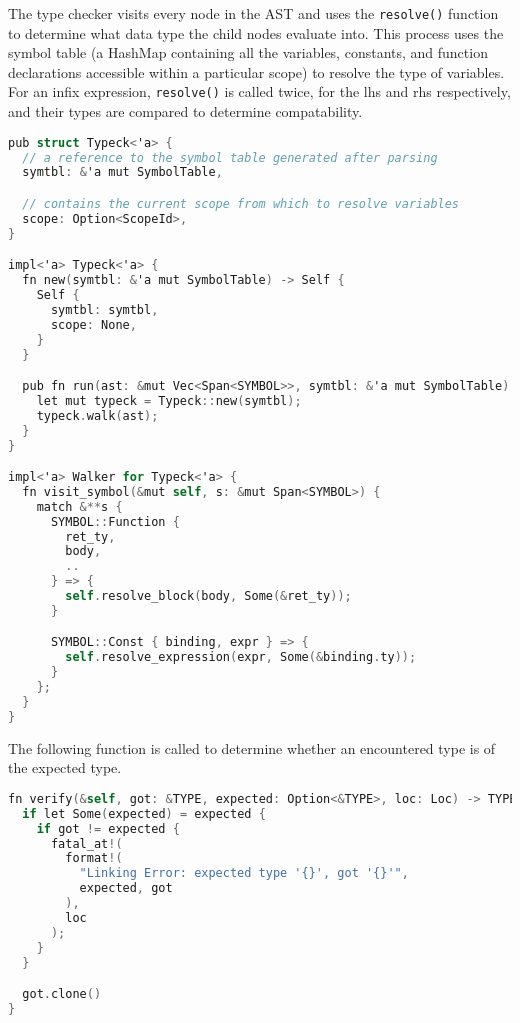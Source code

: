 The type checker visits every node in the AST and uses the \texttt{resolve()} function to determine what data type the child nodes evaluate into. This process uses the symbol table (a HashMap containing all the variables, constants, and function declarations accessible within a particular scope) to resolve the type of variables. For an infix expression, \texttt{resolve()} is called twice, for the lhs and rhs respectively, and their types are compared to determine compatability.  

\begin{lstlisting}[language=C]
pub struct Typeck<'a> {
  // a reference to the symbol table generated after parsing
  symtbl: &'a mut SymbolTable,

  // contains the current scope from which to resolve variables
  scope: Option<ScopeId>,
}

impl<'a> Typeck<'a> {
  fn new(symtbl: &'a mut SymbolTable) -> Self {
    Self {
      symtbl: symtbl,
      scope: None,
    }
  }

  pub fn run(ast: &mut Vec<Span<SYMBOL>>, symtbl: &'a mut SymbolTable) {
    let mut typeck = Typeck::new(symtbl);
    typeck.walk(ast);
  } 
}

impl<'a> Walker for Typeck<'a> {
  fn visit_symbol(&mut self, s: &mut Span<SYMBOL>) {
    match &**s {
      SYMBOL::Function {
        ret_ty,
        body,
        ..
      } => {
        self.resolve_block(body, Some(&ret_ty));
      }

      SYMBOL::Const { binding, expr } => {
        self.resolve_expression(expr, Some(&binding.ty));
      }
    };
  }
}
\end{lstlisting}

The following function is called to determine whether an encountered type is of the expected type.

\begin{lstlisting}[language=C]
fn verify(&self, got: &TYPE, expected: Option<&TYPE>, loc: Loc) -> TYPE {
  if let Some(expected) = expected {
    if got != expected {
      fatal_at!(
        format!(
          "Linking Error: expected type '{}', got '{}'", 
          expected, got
        ),
        loc
      );
    }
  }

  got.clone()
} 
\end{lstlisting}

